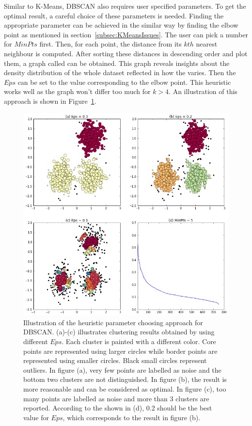 Similar to K-Means, DBSCAN also requires user specified parameters. To get the optimal result, a careful choice of these parameters is needed. Finding the appropriate parameter can be achieved in the similar way by finding the elbow point as mentioned in section~\ref{subsec:KMeansIssues}. The user can pick a number for $MinPts$ first. Then, for each point, the distance from its $kth$ nearest neighbour is computed. After sorting these distances in descending order and plot them, a graph called  can be obtained. This graph reveals insights about the density distribution of the whole dataset reflected in how the  varies. Then the $Eps$ can be set to the value corresponding to the elbow point. This heuristic works well as the graph won't differ too much for $k > 4$. An illustration of this approach is shown in Figure~\ref{fig:DBSCANParameter}.~\cite{ester1996density}

\begin{figure}
	\begin{center}
		\includegraphics[width=\textwidth]{images/DBSCANParameter.png}
		\caption{Illustration of the heuristic parameter choosing approach for DBSCAN. (a)-(c) illustrates clustering results obtained by using different $Eps$. Each cluster is painted with a different color. Core points are represented using larger circles while border points are represented using smaller circles. Black small circles represent outliers. In figure (a), very few points are labelled as noise and the bottom two clusters are not distinguished. In figure (b), the result is more reasonable and can be considered as optimal. In figure (c), too many points are labelled as noise and more than 3 clusters are reported. According to the  shown in (d), 0.2 should be the best value for $Eps$, which corresponds to the result in figure (b).}
		\label{fig:DBSCANParameter}
	\end{center}
\end{figure}